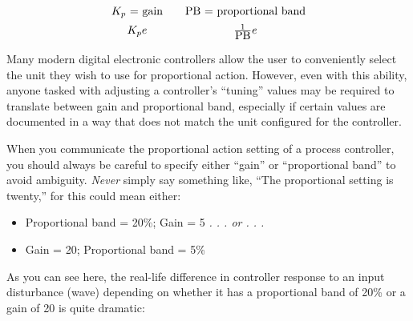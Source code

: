 
$$\vbox{\offinterlineskip
\halign{\strut
\quad\hfil # \ \hfil & 
\quad\hfil # \ \hfil \cr
%
$K_p$ = gain & PB = proportional band \cr
%
\noalign{\vskip 5pt}
%
$K_p e$  &  ${1 \over \hbox{PB}} e$ \cr
%
} %
}$$ %

Many modern digital electronic controllers allow the user to conveniently select the unit they wish to use for proportional action.  However, even with this ability, anyone tasked with adjusting a controller's ``tuning'' values may be required to translate between gain and proportional band, especially if certain values are documented in a way that does not match the unit configured for the controller.  

When you communicate the proportional action setting of a process controller, you should always be careful to specify either ``gain'' or ``proportional band'' to avoid ambiguity.  \textit{Never} simply say something like, ``The proportional setting is twenty,'' for this could mean either:

\begin{itemize}
\item Proportional band = 20\%; Gain = 5 \hskip 20pt \textit{. . . or . . .}
\item Gain = 20; Proportional band = 5\%
\end{itemize}

As you can see here, the real-life difference in controller response to an input disturbance (wave) depending on whether it has a proportional band of 20\% or a gain of 20 is quite dramatic:

